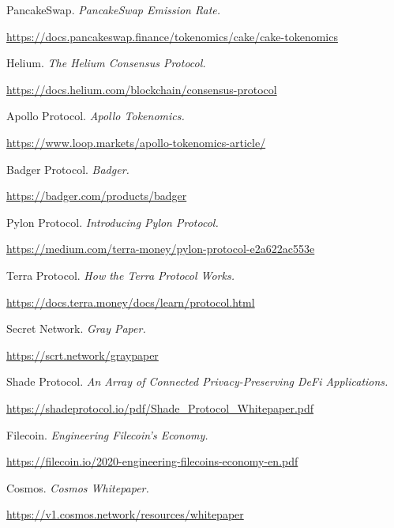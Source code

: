 \documentclass[11pt, nofootinbib]{article}
\begin{document}
\newpage
\begin{thebibliography}{9}
PancakeSwap. \emph{PancakeSwap Emission Rate.}

\url{https://docs.pancakeswap.finance/tokenomics/cake/cake-tokenomics}

Helium. \emph{The Helium Consensus Protocol.}

\url{https://docs.helium.com/blockchain/consensus-protocol}

Apollo Protocol. \emph{Apollo Tokenomics.}

\url{https://www.loop.markets/apollo-tokenomics-article/}

Badger Protocol. \emph{Badger.}

\url{https://badger.com/products/badger}

Pylon Protocol. \emph{Introducing Pylon Protocol.}

\url{https://medium.com/terra-money/pylon-protocol-e2a622ac553e}


Terra Protocol. \emph{How the Terra Protocol Works.}

\url{https://docs.terra.money/docs/learn/protocol.html}

Secret Network. \emph{Gray Paper.}

\url{https://scrt.network/graypaper}

Shade Protocol. \emph{An Array of Connected Privacy-Preserving DeFi Applications.}

\url{https://shadeprotocol.io/pdf/Shade_Protocol_Whitepaper.pdf}

Filecoin. \emph{Engineering Filecoin’s Economy.}

\url{https://filecoin.io/2020-engineering-filecoins-economy-en.pdf}

Cosmos. \emph{Cosmos Whitepaper.}

\url{https://v1.cosmos.network/resources/whitepaper}

\end{thebibliography}




\newpage
\end{document}
